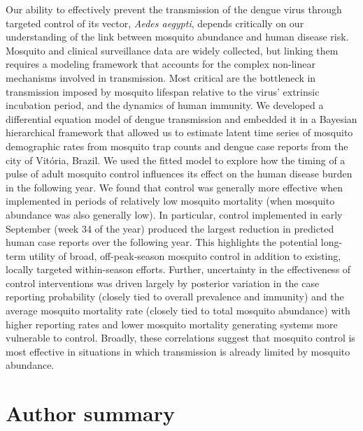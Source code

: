 \documentclass[10pt,letterpaper]{article}
\begin{document}
Our ability to effectively prevent the transmission of the dengue virus through targeted control of its vector, \emph{Aedes aegypti}, depends critically on our understanding of the link between mosquito abundance and human disease risk.
Mosquito and clinical surveillance data are widely collected, but linking them requires a modeling framework that accounts for the complex non-linear mechanisms involved in transmission.
Most critical are the bottleneck in transmission imposed by mosquito lifespan relative to the virus' extrinsic incubation period, and the dynamics of human immunity.
We developed a differential equation model of dengue transmission and embedded it in a Bayesian hierarchical framework that allowed us to estimate latent time series of mosquito demographic rates from mosquito trap counts and dengue case reports from the city of Vit\'oria, Brazil.
We used the fitted model to explore how the timing of a pulse of adult mosquito control influences its effect on the human disease burden in the following year.
We found that control was generally more effective when implemented in periods of relatively low mosquito mortality (when mosquito abundance was also generally low).
In particular, control implemented in early September (week 34 of the year) produced the largest reduction in predicted human case reports over the following year.
This highlights the potential long-term utility of broad, off-peak-season mosquito control in addition to existing, locally targeted within-season efforts.
Further, uncertainty in the effectiveness of control interventions was driven largely by posterior variation in the case reporting probability (closely tied to overall prevalence and immunity) and the average mosquito mortality rate (closely tied to total mosquito abundance) with higher reporting rates and lower mosquito mortality generating systems more vulnerable to control.
Broadly, these correlations suggest that mosquito control is most effective in situations in which transmission is already limited by mosquito abundance.

\section*{Author summary}
\end{document}
